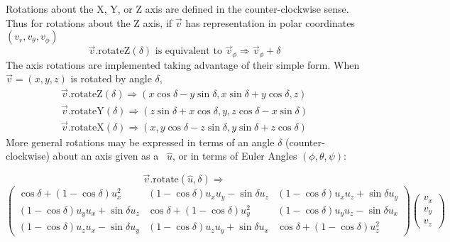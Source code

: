 \noindent
Rotations about the X, Y, or Z axis are defined in the counter-clockwise
sense.  Thus for rotations about the Z axis, if $\vec{v}$ has representation
in polar coordinates $( v_r, v_\theta, v_\phi )$
\begin{equation}
  \vec{v}.\mbox{rotateZ} ( \delta ) \mbox{ is equivalent to }
  \vec{v}_\phi \Longrightarrow \vec{v}_\phi + \delta
    \label{eq:rotZ:2}
\end{equation}
\noindent
The axis rotations are implemented taking advantage of their
simple form.  When $\vec{v} = (x, y, z)$ is rotated by angle $\delta$,
\begin{eqnarray}
  \vec{v}.\mbox{rotateZ} (\delta) \Longrightarrow
    ( x \cos\delta - y \sin\delta, x \sin\delta + y \cos\delta, z )
    \label{eq:rotZ} \\
  \vec{v}.\mbox{rotateY} (\delta) \Longrightarrow
    ( z \sin\delta + x \cos\delta, y, z \cos\delta - x \sin\delta )
    \label{eq:rotY} \\
  \vec{v}.\mbox{rotateX} (\delta) \Longrightarrow
    ( x, y \cos\delta - z \sin\delta, y \sin\delta + z \cos\delta )
    \label{eq:rotX}
\end{eqnarray}
\noindent
More general rotations may be expressed in terms of
an angle $\delta$ (counter-clockwise) about an axis given
as a \UV\ $\hat{u}$, or in terms of Euler Angles
$(\phi, \theta, \psi)$:

\[  \vec{v}.\mbox{rotate}(\hat{u},\delta) \Longrightarrow \]
\begin{equation}
\label{eq:axisrot}
\left(
\begin{array}{ccc}
\cos \delta + (1 - \cos \delta ) u_x^2 &
(1 - \cos \delta ) u_x u_y - \sin \delta u_z &
(1 - \cos \delta ) u_x u_z + \sin \delta u_y \\
(1 - \cos \delta ) u_y u_x + \sin \delta u_z &
\cos \delta + (1 - \cos \delta ) u_y^2 &
(1 - \cos \delta ) u_y u_z - \sin \delta u_x \\
(1 - \cos \delta ) u_z u_x - \sin \delta u_y &
(1 - \cos \delta ) u_z u_y + \sin \delta u_x &
\cos \delta + (1 - \cos \delta ) u_z^2
\end{array}
\right)
\left(
\begin{array}{c}
v_x\\
v_y\\
v_z
\end{array}
\right)
\end{equation}

